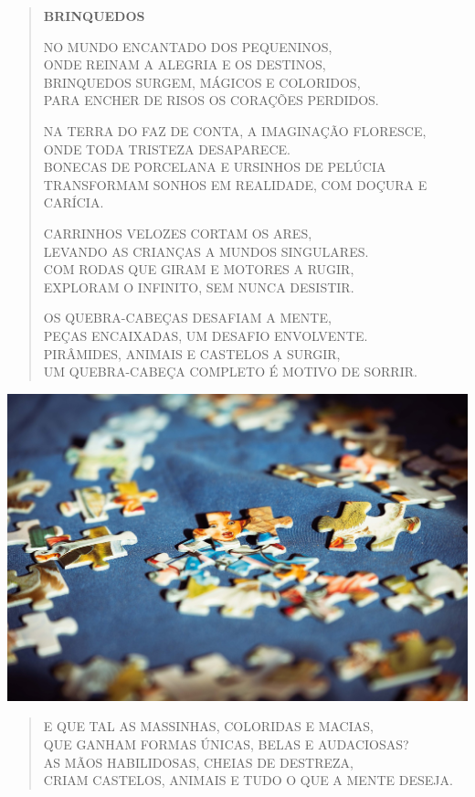\begin{myquote}
\begin{verse}
\textbf{BRINQUEDOS}

NO MUNDO ENCANTADO DOS PEQUENINOS,\\
ONDE REINAM A ALEGRIA E OS DESTINOS,\\
BRINQUEDOS SURGEM, MÁGICOS E COLORIDOS,\\
PARA ENCHER DE RISOS OS CORAÇÕES PERDIDOS.


NA TERRA DO FAZ DE CONTA, A IMAGINAÇÃO FLORESCE,\\
ONDE TODA TRISTEZA DESAPARECE.\\
BONECAS DE PORCELANA E URSINHOS DE PELÚCIA\\
TRANSFORMAM SONHOS EM REALIDADE, COM DOÇURA E CARÍCIA.


CARRINHOS VELOZES CORTAM OS ARES,\\
LEVANDO AS CRIANÇAS A MUNDOS SINGULARES.\\
COM RODAS QUE GIRAM E MOTORES A RUGIR,\\
EXPLORAM O INFINITO, SEM NUNCA DESISTIR.


OS QUEBRA-CABEÇAS DESAFIAM A MENTE,\\
PEÇAS ENCAIXADAS, UM DESAFIO ENVOLVENTE.\\
PIRÂMIDES, ANIMAIS E CASTELOS A SURGIR,\\
UM QUEBRA-CABEÇA COMPLETO É MOTIVO DE SORRIR.
\end{verse}

\begin{center}
\includegraphics[width=.9\textwidth]{media/image266.png}
\end{center}

\begin{verse}
E QUE TAL AS MASSINHAS, COLORIDAS E MACIAS,\\
QUE GANHAM FORMAS ÚNICAS, BELAS E AUDACIOSAS?\\
AS MÃOS HABILIDOSAS, CHEIAS DE DESTREZA,\\
CRIAM CASTELOS, ANIMAIS E TUDO O QUE A MENTE DESEJA.



\end{verse}
\end{myquote}
